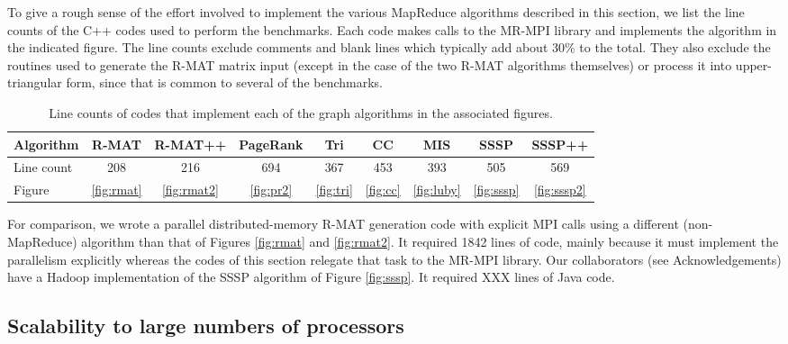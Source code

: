 To give a rough sense of the effort involved to implement the various
MapReduce algorithms described in this section, we list the line
counts of the C++ codes used to perform the benchmarks.  Each code
makes calls to the MR-MPI library and implements the algorithm in the
indicated figure.  The line counts exclude comments and blank lines
which typically add about 30\% to the total.  They also exclude the
routines used to generate the R-MAT matrix input (except in the case
of the two R-MAT algorithms themselves) or process it into
upper-triangular form, since that is common to several of the
benchmarks.

\begin{table}
\begin{center}
\begin{tabular}{|l|c|c|c|c|c|c|c|c|}
\hline
Algorithm & R-MAT & R-MAT++ & PageRank & Tri & CC & MIS & SSSP & SSSP++ \\
\hline
Line count & 208 & 216 & 694 & 367 & 453 & 393 & 505 & 569 \\
Figure & \ref{fig:rmat} & \ref{fig:rmat2} & \ref{fig:pr2} & \ref{fig:tri} & \ref{fig:cc} & \ref{fig:luby} & \ref{fig:sssp} & \ref{fig:sssp2} \\
\hline
\end{tabular}
\caption{Line counts of codes that implement each of the graph
  algorithms in the associated figures.}
\label{t:rmat}
\end{center}
\end{table}

For comparison, we wrote a parallel distributed-memory R-MAT
generation code with explicit MPI calls using a different
(non-MapReduce) algorithm than that of Figures \ref{fig:rmat} and
\ref{fig:rmat2}.  It required 1842 lines of code, mainly because it
must implement the parallelism explicitly whereas the codes of this
section relegate that task to the MR-MPI library.  Our collaborators
(see Acknowledgements) have a Hadoop implementation of the SSSP
algorithm of Figure \ref{fig:sssp}.  It required XXX lines of Java
code.

\subsection{Scalability to large numbers of processors}


